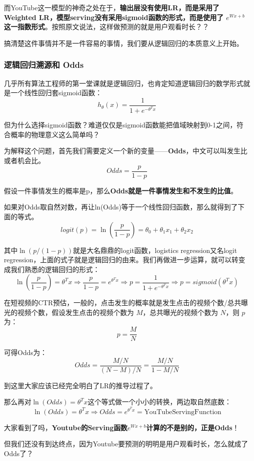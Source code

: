 \documentclass[12pt]{article}
\begin{document}
而YouTube这一模型的神奇之处在于，\textbf{输出层没有使用LR，而是采用了Weighted LR，模型serving没有采用sigmoid函数的形式，而是使用了
$e^{Wx+b}$这一指数形式}。按照原文说法，这样做预测的就是用户观看时长？？

搞清楚这件事情并不是一件容易的事情，我们要从逻辑回归的本质意义上开始。

\subsubsection{逻辑回归溯源和 Odds}
几乎所有算法工程师的第一堂课就是逻辑回归，也肯定知道逻辑回归的数学形式就是一个线性回归套sigmoid函数：
$$
h_\theta(x) = \frac{1}{1+e^{-\theta^Tx}}
$$

但为什么选择sigmoid函数？难道仅仅是sigmoid函数能把值域映射到0-1之间，符合概率的物理意义这么简单吗？

为解释这个问题，首先我们需要定义一个新的变量——\textbf{Odds}，中文可以叫发生比或者机会比。
$$
Odds = \frac{p}{1-p}
$$

假设一件事情发生的概率是p，那么\textbf{Odds就是一件事情发生和不发生的比值}。

如果对Odds取自然对数，再让ln(Odds)等于一个线性回归函数，那么就得到了下面的等式。
$$
logit(p) = \ln(\frac{p}{1-p}) = \theta_0 + \theta_1x_1 + \theta_2x_2
$$

其中$\ln(p/(1-p))$就是大名鼎鼎的logit函数，logistics regression又名logit regression，上面的式子就是逻辑回归的由来。我们再做进一步运算，就可以转变成我们熟悉的逻辑回归的形式：
$$
 \ln(\frac{p}{1-p}) = \theta^Tx \Rightarrow \frac{p}{1-p} = e^{\theta^Tx} \Rightarrow p = \frac{1}{1+e^{-\theta^Tx}} \Rightarrow p = sigmoid(\theta^Tx)
$$

在短视频的CTR预估\cite{Understand_Weighted_LR}，一般的，点击发生的概率就是发生点击的视频个数/总共曝光的视频个数，假设发生点击的视频个数为 $M$，总共曝光的视频个数为 $N$，则 $p$ 为：
$$
p = \frac{M}{N}
$$

可得Odds为：
$$
Odds = \frac{M/N}{(N-M)/N} = \frac{M/N}{1-M/N} 
$$

到这里大家应该已经完全明白了LR的推导过程了。

那么再对$\ln(Odds) = \theta^Tx$这个等式做一个小小的转换，两边取自然底数：
$$
\ln(Odds) = \theta^Tx \Rightarrow Odds = e^{\theta^Tx} = \text{YouTubeServingFunction}
$$

大家看到了吗，\textbf{Youtube的Serving函数$e^{Wx+b}$计算的不是别的，正是Odds}！

但我们还没有到达终点，因为Youtube要预测的明明是用户观看时长，怎么就成了Odds了？
\end{document}
